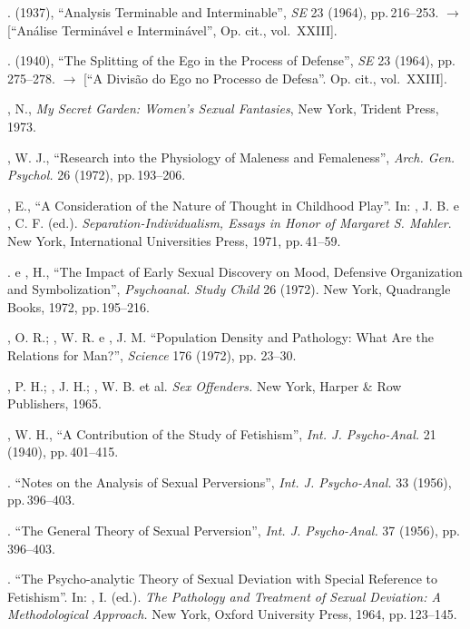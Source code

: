 \begin{bibliohedra}
. (1937), ``Analysis Terminable and
Interminable'', \textit{SE }23 (1964), pp.\,216--253.
{$\bm{\rightarrow}$} [``Análise Terminável e Interminável'', Op. cit., vol.~XXIII].

. (1940), ``The Splitting of the Ego in the Process
of Defense'', \textit{SE }23 \textit{ }(1964), pp.\,275--278.
{$\bm{\rightarrow}$} [``A Divisão do Ego no Processo de Defesa''. Op. cit., vol.~XXIII].

, N., \textit{My Secret Garden: Women's Sexual
Fantasies}, New York, Trident Press, 1973.

, W. J., ``Research into the Physiology of Maleness and
Femaleness'', \textit{Arch. Gen. Psychol.} 26 (1972), pp.\,193--206.

, E., ``A Consideration of the Nature of Thought in
Childhood Play''. In: , J. B. e , C. F. (ed.). 
\textit{Separation-Individualism, Essays in
Honor of Margaret S. Mahler}. New York, International Universities Press, 1971, pp.\,41--59.

. e , H., ``The Impact of Early Sexual
Discovery on Mood, Defensive Organization and Symbolization'',
\textit{Psychoanal. Study Child }26 (1972). New York, Quadrangle
Books, 1972, pp.\,195--216.

, O. R.; , W. R. e , J. M. ``Population Density
and Pathology: What Are the Relations for Man?'', \textit{Science
}176 (1972), pp. 23--30.

, P. H.; , J. H.; , W. B. et al. \textit{Sex Offenders.
}New York, Harper \& Row Publishers, 1965.

, W. H., ``A Contribution of the Study of
Fetishism'', \textit{Int. J. Psycho-Anal. } 21 (1940), pp.\,401--415.

. ``Notes on the Analysis of Sexual
Perversions'', \textit{Int. J. Psycho-Anal. }33 (1956), pp.\,396--403.

. ``The General Theory of Sexual
Perversion'', \textit{Int. J. Psycho-Anal. }37 (1956), pp.\,396--403.

. ``The Psycho-analytic Theory of Sexual
Deviation with Special Reference to Fetishism''. In: , I. (ed.). \textit{The
Pathology and Treatment of Sexual Deviation: A Methodological Approach.} 
New York, Oxford University Press, 1964, pp.\,123--145.


\end{bibliohedra}
